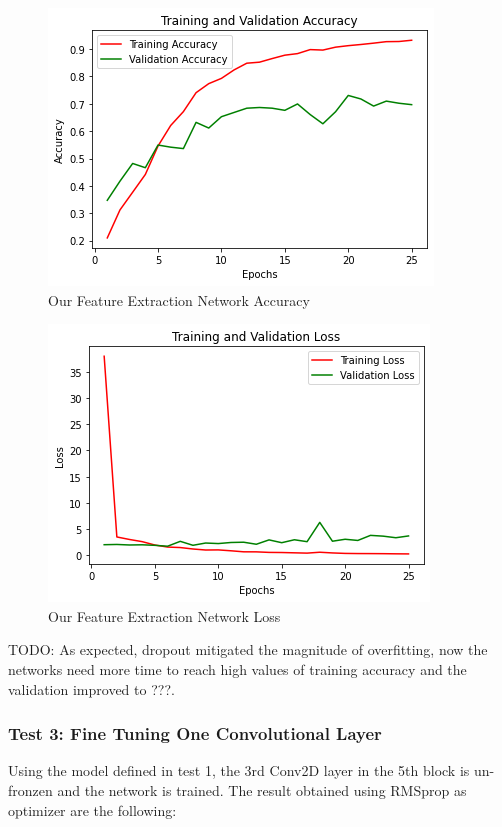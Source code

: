 \medskip

\begin{figure}[H]
	\centering
	\includegraphics[height=0.45\textwidth]{img/vgg16/vgg16fe2acc.png}
	\caption{Our Feature Extraction Network Accuracy}
	\label{fig:vgg16fe2acc}
\end{figure}

\begin{figure}[H]
	\centering
	\includegraphics[height=0.45\textwidth]{img/vgg16/vgg16fe2loss.png}
	\caption{Our Feature Extraction Network Loss}
	\label{fig:vgg16fe2oss}
\end{figure}

\noindent TODO: As expected, dropout mitigated the magnitude of overfitting, now the networks need more time to reach high values of training accuracy and the validation improved to ???.



\subsubsection{Test 3: Fine Tuning One Convolutional Layer}
Using the model defined in test 1, the 3rd Conv2D layer in the 5th block is un-fronzen and the network is trained. The result obtained using RMSprop as optimizer are the following:

 
 \medskip

